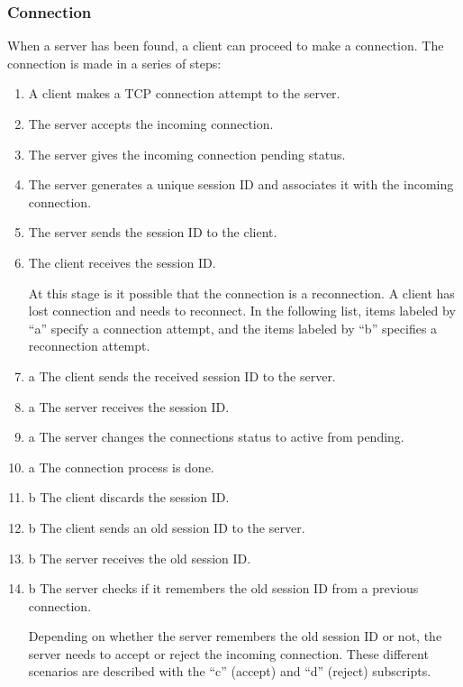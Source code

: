 \documentclass{article}
\begin{document}
\subsubsection{Connection}
When a server has been found, a client can proceed to make a connection. The connection is
made in a series of steps:
\begin{enumerate}
\item A client makes a TCP connection attempt to the server.
\item The server accepts the incoming connection.
\item The server gives the incoming connection pending status.
\item The server generates a unique session ID and associates it with the incoming connection.
\item The server sends the session ID to the client.
\item The client receives the session ID.

At this stage is it possible that the connection is a reconnection. A client has lost connection and
needs to reconnect. In the following list, items labeled by “a” specify a connection attempt, and
the items labeled by “b” specifies a reconnection attempt.

\item a The client sends the received session ID to the server.

\item a The server receives the session ID.

\item a The server changes the connections status to active from pending.

\item a The connection process is done.

\item b The client discards the session ID.

\item b The client sends an old session ID to the server.

\item b The server receives the old session ID.

\item b The server checks if it remembers the old session ID from a previous connection.

Depending on whether the server remembers the old session ID or not, the server needs to accept
or reject the incoming connection. These different scenarios are described with the “c” (accept)
and “d” (reject) subscripts.


\end{enumerate}
\end{document}
